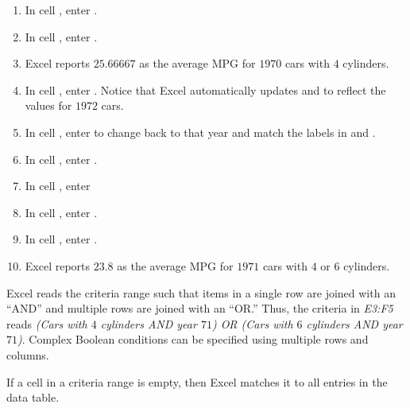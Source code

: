 \begin{enumerate}
	\item In cell , enter .
	\item In cell , enter .
	\item Excel reports $ 25.66667 $ as the average MPG for $ 1970 $ cars with $ 4 $ cylinders.
	
	\item In cell , enter . Notice that Excel automatically updates  and  to reflect the values for $ 1972 $ cars.
	\item In cell , enter  to change back to that year and match the labels in  and .

	\item In cell , enter .
	\item In cell , enter 
	\item In cell , enter .
	\item In cell , enter .
	\item Excel reports $ 23.8 $ as the average MPG for $ 1971 $ cars with $ 4 $ or $ 6 $ cylinders. 
\end{enumerate}	
	
Excel reads the criteria range such that items in a single row are joined with an ``AND'' and multiple rows are joined with an ``OR.'' Thus, the criteria in \textit{E3:F5} reads \textit{(Cars with $ 4 $ cylinders AND year $ 71 $) OR (Cars with $ 6 $ cylinders AND year $ 71 $)}. Complex Boolean conditions can be specified using multiple rows and columns.

If a cell in a criteria range is empty, then Excel matches it to all entries in the data table.

